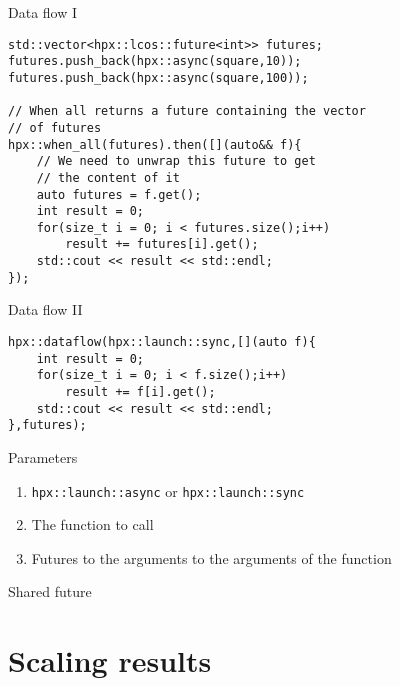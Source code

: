 \documentclass[12pt,t]{beamer}
\begin{document}
\begin{frame}[fragile]{Data flow I}
\begin{lstlisting}
std::vector<hpx::lcos::future<int>> futures;
futures.push_back(hpx::async(square,10));
futures.push_back(hpx::async(square,100));

// When all returns a future containing the vector 
// of futures
hpx::when_all(futures).then([](auto&& f){
    // We need to unwrap this future to get 
    // the content of it
    auto futures = f.get();
    int result = 0;
    for(size_t i = 0; i < futures.size();i++)
        result += futures[i].get();
    std::cout << result << std::endl;
});
\end{lstlisting}
\end{frame}


\begin{frame}[fragile]{Data flow II}

\begin{lstlisting}
hpx::dataflow(hpx::launch::sync,[](auto f){
    int result = 0;
    for(size_t i = 0; i < f.size();i++)
        result += f[i].get();
    std::cout << result << std::endl;
},futures);
\end{lstlisting}

\begin{block}{Parameters}
\begin{enumerate}
\item \lstinline|hpx::launch::async| or \lstinline|hpx::launch::sync|
\item The function to call
\item Futures to the arguments to the arguments of the function
\end{enumerate}
\end{block}


\end{frame}


\begin{frame}{Shared future}



\end{frame}

\section{Scaling results}
\end{document}
